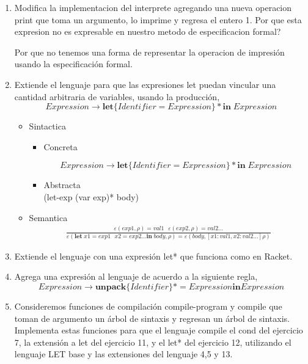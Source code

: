\documentclass{article}
\begin{document}
\begin{enumerate}
    \item Modifica la implementacion del interprete agregando una nueva operacion print que toma un argumento, lo imprime y regresa el entero 1. Por que esta expresion no es expresable en nuestro metodo de especificacion formal?

    Por que no tenemos una forma de representar la operacion de impresión usando la especificación formal.

    \item Extiende el lenguaje para que las expresiones let puedan vincular una cantidad arbitraria de variables, usando la producción, 
    \[Expression \to \textbf{let} \{Identifier = Expression\}* \textbf{in} \; Expression\]

    \begin{itemize}
        \item Sintactica
        \begin{itemize}
            \item Concreta
            
    \[Expression \to \textbf{let} \{Identifier = Expression\}* \textbf{in} \; Expression\]
            \item Abstracta \\
            (let-exp (var exp)* body)
        \end{itemize}
        \item Semantica
        \begin{align*}
            \frac{\varepsilon(exp1, \rho) = val1 \: \: \: \varepsilon(exp2, \rho) = val2 \dots}{\varepsilon(\textbf{let} \; x1 = exp1 \: \: \: x2 = exp2 \dots \textbf{in} \; body, \rho) = \varepsilon (body, [x1 : val1, x2 : val2 \dots] \rho)}
        \end{align*}
    \end{itemize}

    
    
    \item Extiende el lenguaje con una expresión let* que funciona como en Racket.

    

    \item Agrega una expresión al lenguaje de acuerdo a la siguiente regla, 
    \[Expression \to \textbf{unpack} \{Identifier\}*  = Expression \textbf{in} Expression\]

    \item Consideremos funciones de compilación compile-program y compile que toman de argumento un árbol de sintaxis y regresan un árbol de sintaxis. Implementa estas funciones para que el lenguaje compile el cond del ejercicio 7, la extensión a let del ejercicio 11, y el let* del ejercicio 12, utilizando el lenguaje LET base y las extensiones del lenguaje 4,5 y 13.

    
\end{enumerate}
\end{document}
